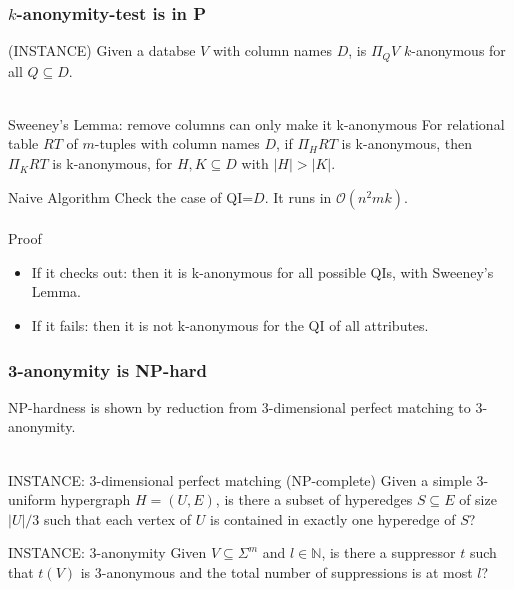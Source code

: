 \documentclass{beamer}
\begin{document}
\begin{frame}
\frametitle{$k$-anonymity-test is in P}
\alert{(INSTANCE)} Given a databse $V$ with column names $D$, is $\Pi_{Q} V$ $k$-anonymous for all $Q \subseteq D$.\\~\\

\begin{block}{Sweeney's Lemma: remove columns can only make it k-anonymous}
For relational table $RT$ of $m$-tuples with column names $D$, if $\Pi_{H} RT$ is k-anonymous, then $\Pi_{K} RT$ is k-anonymous, for $H, K \subseteq D$ with $|H|>|K|$.
\end{block}

\alert{Naive Algorithm}
Check the case of QI=$D$. It runs in $\mathcal{O}(n^2mk)$.\\~\\

\alert{Proof}
\begin{itemize}
    \item If it checks out: then it is k-anonymous \alert{for all possible QIs}, with Sweeney's Lemma.
    \item If it fails: then it is not k-anonymous \alert{for the QI of all attributes}.
\end{itemize}
\end{frame}

\begin{frame}
\frametitle{3-anonymity is NP-hard}
NP-hardness is shown by reduction from 3-dimensional perfect matching to 3-anonymity.\\~\\

\begin{block}{INSTANCE: 3-dimensional perfect matching (NP-complete)}
Given a simple 3-uniform hypergraph $H = (U, E)$, is there a subset of hyperedges $S \subseteq E$ of size $|U|/3$ such that each vertex of $U$ is contained in exactly one hyperedge of $S$?
\end{block}

\begin{block}{INSTANCE: 3-anonymity}
Given $V \subseteq \Sigma^{m}$ and $l \in \mathbb{N}$, is there a suppressor $t$ such that $t(V)$ is 3-anonymous and the total number of suppressions is at most $l$?
\end{block}
\end{frame}
\end{document}
